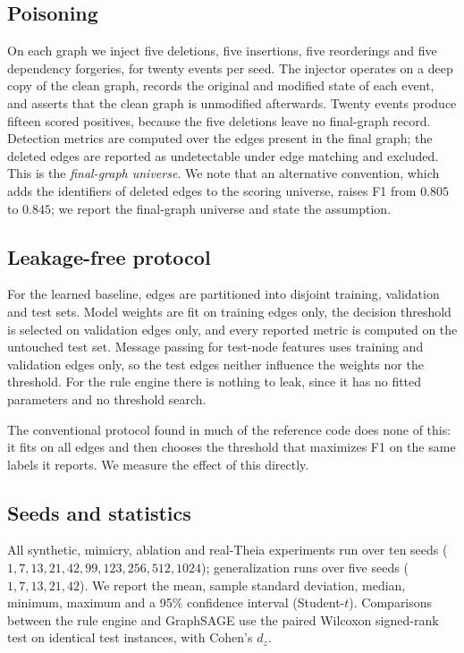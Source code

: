 \documentclass[conference]{IEEEtran}
\begin{document}
\subsection{Poisoning}
On each graph we inject five deletions, five insertions, five reorderings and
five dependency forgeries, for twenty events per seed. The injector operates on
a deep copy of the clean graph, records the original and modified state of each
event, and asserts that the clean graph is unmodified afterwards. Twenty events
produce fifteen scored positives, because the five deletions leave no
final-graph record. Detection metrics are computed over the edges present in the
final graph; the deleted edges are reported as undetectable under edge matching
and excluded. This is the \emph{final-graph universe}. We note that an
alternative convention, which adds the identifiers of deleted edges to the
scoring universe, raises F1 from $0.805$ to $0.845$; we report the
final-graph universe and state the assumption.

\subsection{Leakage-free protocol}
For the learned baseline, edges are partitioned into disjoint training,
validation and test sets. Model weights are fit on training edges only, the
decision threshold is selected on validation edges only, and every reported
metric is computed on the untouched test set. Message passing for test-node
features uses training and validation edges only, so the test edges neither
influence the weights nor the threshold. For the rule engine there is nothing to
leak, since it has no fitted parameters and no threshold search.

The conventional protocol found in much of the reference code does none of
this: it fits on all edges and then chooses the threshold that maximizes F1 on
the same labels it reports. We measure the effect of this directly.

\subsection{Seeds and statistics}
All synthetic, mimicry, ablation and real-Theia experiments run over ten seeds
($1,7,13,21,42,99,123,256,512,1024$); generalization runs over five seeds
($1,7,13,21,42$). We report the mean, sample standard deviation, median, minimum,
maximum and a 95\% confidence interval (Student-$t$). Comparisons between the
rule engine and GraphSAGE use the paired Wilcoxon signed-rank test on identical
test instances, with Cohen's $d_z$.
\end{document}
